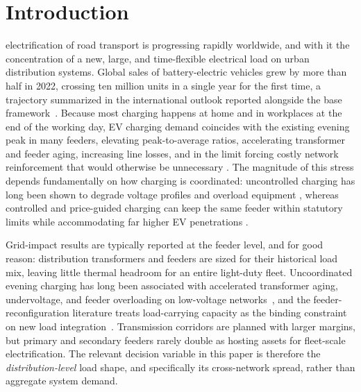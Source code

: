 \documentclass[10pt,journal]{IEEEtran}
\begin{document}
\section{Introduction}\label{sec:intro}
 electrification of road transport is progressing
rapidly worldwide, and with it the concentration of a new, large, and
time-flexible electrical load on urban distribution systems. Global sales
of battery-electric vehicles grew by more than half in 2022, crossing ten
million units in a single year for the first time, a trajectory summarized
in the international outlook reported alongside the base
framework~\cite{lepolesa2026}. Because most charging happens at home and in
workplaces at the end of the working day,
EV charging demand coincides with the existing evening peak in many
feeders, elevating peak-to-average ratios, accelerating transformer and
feeder aging, increasing line losses, and in the limit forcing costly
network reinforcement that would otherwise be unnecessary
\cite{clement2010,richardson2012tsg,richardson2012tpwrs,oconnell2014}. The
magnitude of this stress depends fundamentally on how charging is
coordinated: uncontrolled charging has long been shown to degrade voltage
profiles and overload equipment
\cite{clement2010,richardson2012tsg}, whereas controlled and price-guided
charging can keep the same feeder within statutory limits while
accommodating far higher EV penetrations
\cite{richardson2012tsg,richardson2012tpwrs,oconnell2014,gan2013,callaway2011}.

Grid-impact results are typically reported at the feeder level, and for
good reason: distribution transformers and feeders are sized for their
historical load mix, leaving little thermal headroom for an entire
light-duty fleet. Uncoordinated evening charging has long been associated
with accelerated transformer aging, undervoltage, and feeder overloading
on low-voltage networks~\cite{clement2010,richardson2012tsg}, and the
feeder-reconfiguration literature treats load-carrying capacity as the
binding constraint on new load integration~\cite{baran1989}. Transmission
corridors are planned with larger margins, but primary and secondary
feeders rarely double as hosting assets for fleet-scale electrification.
The relevant decision variable in this paper is therefore the
\emph{distribution-level} load shape, and specifically its cross-network
spread, rather than aggregate system demand.
\end{document}

